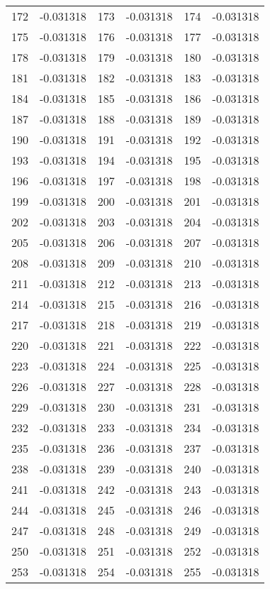 \documentclass[12pt]{article}
\begin{document}
\begin{longtable}{@{}cc|cc|cc@{}}
172 & -0.031318 & 173 & -0.031318 & 174 & -0.031318 \\
175 & -0.031318 & 176 & -0.031318 & 177 & -0.031318 \\
178 & -0.031318 & 179 & -0.031318 & 180 & -0.031318 \\
181 & -0.031318 & 182 & -0.031318 & 183 & -0.031318 \\
184 & -0.031318 & 185 & -0.031318 & 186 & -0.031318 \\
187 & -0.031318 & 188 & -0.031318 & 189 & -0.031318 \\
190 & -0.031318 & 191 & -0.031318 & 192 & -0.031318 \\
193 & -0.031318 & 194 & -0.031318 & 195 & -0.031318 \\
196 & -0.031318 & 197 & -0.031318 & 198 & -0.031318 \\
199 & -0.031318 & 200 & -0.031318 & 201 & -0.031318 \\
202 & -0.031318 & 203 & -0.031318 & 204 & -0.031318 \\
205 & -0.031318 & 206 & -0.031318 & 207 & -0.031318 \\
208 & -0.031318 & 209 & -0.031318 & 210 & -0.031318 \\
211 & -0.031318 & 212 & -0.031318 & 213 & -0.031318 \\
214 & -0.031318 & 215 & -0.031318 & 216 & -0.031318 \\
217 & -0.031318 & 218 & -0.031318 & 219 & -0.031318 \\
220 & -0.031318 & 221 & -0.031318 & 222 & -0.031318 \\
223 & -0.031318 & 224 & -0.031318 & 225 & -0.031318 \\
226 & -0.031318 & 227 & -0.031318 & 228 & -0.031318 \\
229 & -0.031318 & 230 & -0.031318 & 231 & -0.031318 \\
232 & -0.031318 & 233 & -0.031318 & 234 & -0.031318 \\
235 & -0.031318 & 236 & -0.031318 & 237 & -0.031318 \\
238 & -0.031318 & 239 & -0.031318 & 240 & -0.031318 \\
241 & -0.031318 & 242 & -0.031318 & 243 & -0.031318 \\
244 & -0.031318 & 245 & -0.031318 & 246 & -0.031318 \\
247 & -0.031318 & 248 & -0.031318 & 249 & -0.031318 \\
250 & -0.031318 & 251 & -0.031318 & 252 & -0.031318 \\
253 & -0.031318 & 254 & -0.031318 & 255 & -0.031318 \\

\end{longtable}
\end{document}
